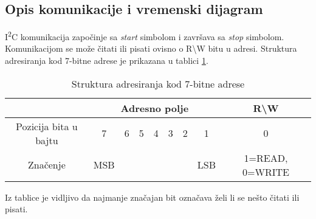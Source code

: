 \subsection{Opis komunikacije i vremenski dijagram}
I\textsuperscript{2}C komunikacija započinje sa \textit{start} simbolom i završava sa \textit{stop} simbolom. Komunikacijom se može čitati ili pisati ovisno o R\textbackslash W bitu u adresi. Struktura adresiranja kod 7-bitne adrese je prikazana u tablici \ref{Tab:i2c_seven_bit_adressing}.
\begin{center}
	\begin{table}[H]
		\centering
		\begin{tabular}{ | c | c | c | c | c | c | c | c | c | }
			\hline
			& \multicolumn{7}{|c|}{Adresno polje} & R\textbackslash W \\
			\hline
			Pozicija bita u bajtu & 7 & 6 & 5 & 4 & 3 & 2 & 1 & 0 \\
			\hline
			Značenje & MSB & \multicolumn{5}{|c|}{} & LSB & 1=READ, 0=WRITE \\
			\hline
		\end{tabular}
		\caption{Struktura adresiranja kod 7-bitne adrese \cite{i2c_wikipedia}}
		\label{Tab:i2c_seven_bit_adressing}
	\end{table}
\end{center}
Iz tablice je vidljivo da najmanje značajan bit označava želi li se nešto čitati ili pisati.

